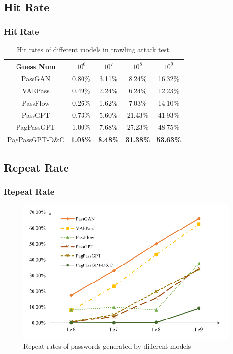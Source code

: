 \documentclass[
	12pt, %
]{beamer}
\begin{document}
\subsection{Hit Rate}
\begin{frame}
	\frametitle{Hit Rate}
	

	\begin{table}[h]
		\centering
		\caption{Hit rates of different models in trawling attack test.}
		\begin{tabular}{c c c c c}
			\hline
			\textbf{Guess Num} & \textbf{$10^6$} & \textbf{$10^7$} & \textbf{$10^8$} & \textbf{$10^9$} \\ \hline \hline
			PassGAN & 0.80\% & 3.11\% & 8.24\% & 16.32\% \\ 
			VAEPass & 0.49\% & 2.24\% & 6.24\% & 12.23\% \\ 
			PassFlow & 0.26\% & 1.62\% & 7.03\% & 14.10\% \\ 
			PassGPT & 0.73\% & 5.60\% & 21.43\% & 41.93\% \\ 
			PagPassGPT & 1.00\% & 7.68\% & 27.23\% & 48.75\% \\ 
			PagPassGPT-D\&C & \textbf{1.05\%} & \textbf{8.48\%} & \textbf{31.38\%} & \textbf{53.63\%} \\ \hline
		\end{tabular}
		\label{table:hit_rates}
	\end{table}
\end{frame}




\subsection{Repeat Rate}
\begin{frame}
	\frametitle{Repeat Rate}
	
	
	\begin{figure}
		\centering
		\includegraphics[width=0.8\linewidth]{Images/img7}
		\caption{Repeat rates of passwords generated by different models}
		\label{fig:Repeat rates of passwords generated by different models}
	\end{figure}
\end{frame}
\end{document}
